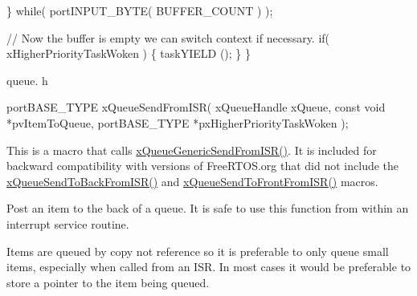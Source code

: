 \begin{DoxyPre}   \} while( portINPUT\_BYTE( BUFFER\_COUNT ) );\end{DoxyPre}



\begin{DoxyPre}   // Now the buffer is empty we can switch context if necessary.
   if( xHigherPriorityTaskWoken )
   \{
    taskYIELD ();
   \}
\}
\end{DoxyPre}


queue. h 
\begin{DoxyPre}
portBASE\_TYPE xQueueSendFromISR(
                                 xQueueHandle xQueue,
                                 const void *pvItemToQueue,
                                 portBASE\_TYPE *pxHigherPriorityTaskWoken
                            );
\end{DoxyPre}


This is a macro that calls \hyperlink{queue_8h_a7f50aeaeff6fb3ae7d14387d6096ec67}{x\+Queue\+Generic\+Send\+From\+I\+S\+R()}. It is included for backward compatibility with versions of Free\+R\+T\+O\+S.\+org that did not include the \hyperlink{queue_8h_a51e9f73417b11441a181cdc4f33a68e9}{x\+Queue\+Send\+To\+Back\+From\+I\+S\+R()} and \hyperlink{queue_8h_af03b83396462affe9e28302660e7b9c6}{x\+Queue\+Send\+To\+Front\+From\+I\+S\+R()} macros.

Post an item to the back of a queue. It is safe to use this function from within an interrupt service routine.

Items are queued by copy not reference so it is preferable to only queue small items, especially when called from an I\+SR. In most cases it would be preferable to store a pointer to the item being queued.


